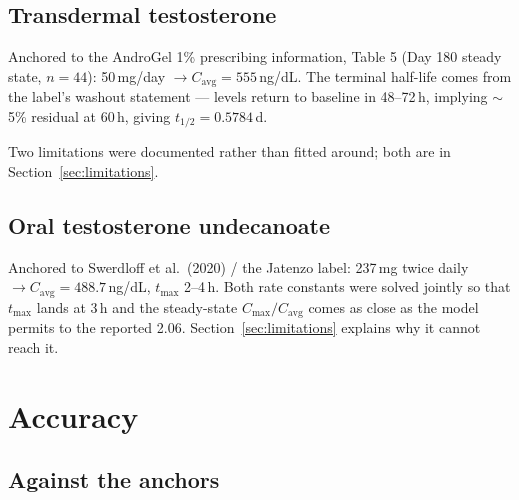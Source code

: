 \documentclass[11pt,a4paper]{article}
\begin{document}
\subsection{Transdermal testosterone}

Anchored to the AndroGel 1\% prescribing information, Table 5 (Day 180 steady
state, $n=44$): 50\,mg/day $\to C_{\mathrm{avg}} = 555$\,ng/dL. The terminal
half-life comes from the label's washout statement --- levels return to baseline
in 48--72\,h, implying $\sim$5\% residual at 60\,h, giving $t_{1/2} = 0.5784$\,d.

Two limitations were documented rather than fitted around; both are in
Section~\ref{sec:limitations}.

\subsection{Oral testosterone undecanoate}

Anchored to Swerdloff et al.\ (2020) / the Jatenzo label: 237\,mg twice daily
$\to C_{\mathrm{avg}} = 488.7$\,ng/dL, $t_{\max}$ 2--4\,h. Both rate constants
were solved jointly so that $t_{\max}$ lands at 3\,h and the steady-state
$C_{\max}/C_{\mathrm{avg}}$ comes as close as the model permits to the reported
2.06. Section~\ref{sec:limitations} explains why it cannot reach it.

\section{Accuracy}

\subsection{Against the anchors}
\end{document}

